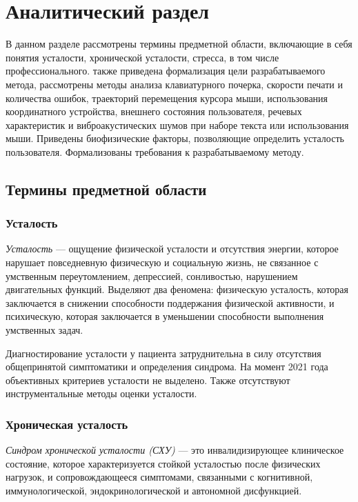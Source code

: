 \section{Аналитический раздел}
В данном разделе рассмотрены термины предметной области, включающие в себя понятия усталости, хронической усталости, стресса, в том числе профессионального. также приведена формализация цели разрабатываемого метода, рассмотрены методы анализа клавиатурного почерка, скорости печати и количества ошибок, траекторий перемещения курсора мыши, использования координатного устройства, внешнего состояния пользователя, речевых характеристик и виброакустических шумов при наборе текста или использования мыши. Приведены биофизические факторы, позволяющие определить усталость пользователя. Формализованы требования к разрабатываемому методу.

\subsection{Термины предметной области}
\subsubsection{Усталость}
\textit{Усталость} --- ощущение физической усталости и отсутствия энергии, которое нарушает повседневную физическую и социальную жизнь, не связанное с умственным переутомлением, депрессией, сонливостью, нарушением двигательных функций. Выделяют два феномена: физическую усталость, которая заключается в снижении способности поддержания физической активности, и психическую, которая заключается в уменьшении способности выполнения умственных задач. \cite{fatigueAsSymptom}

Диагностирование усталости у пациента затруднительна в силу отсутствия общепринятой симптоматики и определения синдрома. На момент 2021 года объективных критериев усталости не выделено. Также отсутствуют инструментальные методы оценки усталости. \cite{fatigueAsSymptom}

\subsubsection{Хроническая усталость}
\textit{Синдром хронической усталости (СХУ)} --- это инвалидизирующее клиническое состояние, которое характеризуется стойкой усталостью после физических нагрузок, и сопровождающееся симптомами, связанными с когнитивной, иммунологической, эндокринологической и автономной дисфункцией. \cite{syndromOfChrono}

